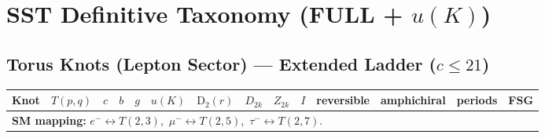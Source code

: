 \documentclass[a4paper,11pt]{article}
\newcommand{\Dk}[1]{\ensuremath{\mathrm{D}_{#1}}}
\begin{document}
\section*{SST Definitive Taxonomy (FULL + $u(K)$)}
\subsection*{Torus Knots (Lepton Sector) — Extended Ladder ($c\le 21$)}
\begin{longtable}{lccccccccccccc}
\toprule
Knot & $T(p,q)$ & $c$ & $b$ & $g$ & $u(K)$ & $\Dk{2}(r)$ & $D_{2k}$ & $Z_{2k}$ & $I$ & reversible & amphichiral & periods & FSG \\
\midrule
\multicolumn{14}{l}{\textbf{SM mapping:} $e^- \leftrightarrow T(2,3)$,\ $\mu^- \leftrightarrow T(2,5)$,\ $\tau^- \leftrightarrow T(2,7)$.} \\ \hline


\end{longtable}
\end{document}
